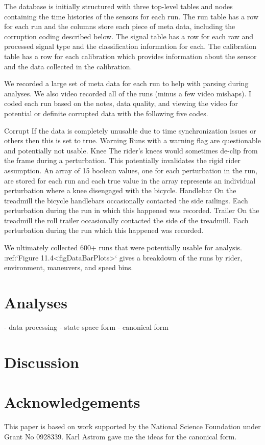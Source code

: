 \documentclass{article}
\begin{document}
The database is initially structured with three top-level tables and nodes
containing the time histories of the sensors for each run. The run table has a
row for each run and the columns store each piece of meta data, including the
corruption coding described below. The signal table has a row for each raw and
processed signal type and the classification information for each. The
calibration table has a row for each calibration which provides information
about the sensor and the data collected in the calibration.

We recorded a large set of meta data for each run to help with parsing during
analyses. We also video recorded all of the runs (minus a few video mishaps).
I coded each run based on the notes, data quality, and viewing the video for
potential or definite corrupted data with the following five codes.

Corrupt
   If the data is completely unusable due to time synchronization issues or
   others then this is set to true.
Warning
   Runs with a warning flag are questionable and potentially not usable.
Knee
   The rider's knees would sometimes de-clip from the frame during a
   perturbation. This potentially invalidates the rigid rider assumption. An
   array of 15 boolean values, one for each perturbation in the run, are stored
   for each run and each true value in the array represents an individual
   perturbation where a knee disengaged with the bicycle.
Handlebar
   On the treadmill the bicycle handlebars occasionally contacted the side
   railings. Each perturbation during the run in which this happened was
   recorded.
Trailer
   On the treadmill the roll trailer occasionally contacted the side of the
   treadmill. Each perturbation during the run which this happened was
   recorded.

We ultimately collected 600+ runs that were potentially usable for analysis.
:ref:`Figure 11.4<figDataBarPlots>` gives a breakdown of the runs by rider,
environment, maneuvers, and speed bins.
\section{Analyses}

- data processing
- state space form
- canonical form

\section{Discussion}


\section{Acknowledgements}

This paper is based on work supported by the National Science Foundation under
Grant No 0928339. Karl Astrom gave me the ideas for the canonical form.
\end{document}
